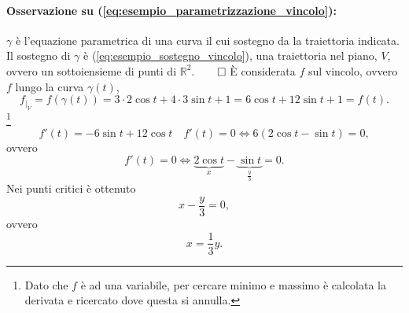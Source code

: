 \begin{example}
	\paragraph{Osservazione su (\ref{eq:esempio_parametrizzazione_vincolo}):} $\gamma$ è l'equazione parametrica di una curva il cui sostegno da la traiettoria indicata. Il sostegno di $\gamma$ è (\ref{eq:esempio_sostegno_vincolo}), una traiettoria nel piano, $V$, ovvero un sottoiensieme di punti di $\mathbb{R}^2$.$\qed$
	È considerata $f$ sul vincolo, ovvero $f$ lungo la curva $\gamma(t)$,
	\begin{equation*}
		f_{|_V} = f(\gamma(t)) = 3\cdot 2\cos t + 4\cdot 3\sin t +1 = 6\cos t + 12 \sin t +1 = f(t).
	\end{equation*}
	\footnote{Dato che $f$ è ad una variabile, per cercare minimo e massimo è calcolata la derivata e ricercato dove questa si annulla.}
	\begin{equation*}
		f'(t) = -6\sin t + 12 \cos t\quad f'(t)=0 \iff 6(2\cos t- \sin t) = 0,
	\end{equation*}
	ovvero 
	\begin{equation*}
		f'(t)=0 \iff \underbrace{2\cos t}_{x} - \underbrace{\sin t}_{\frac{y}{3}} = 0.
	\end{equation*}
	Nei punti critici è ottenuto
	\begin{equation*}
		x - \frac{y}{3} = 0,
	\end{equation*}
	ovvero
	\begin{equation}\label{eq:esempio_parametrizzazione_vincolo1}
		x = \frac{1}{3} y.
	\end{equation}

\end{example}
